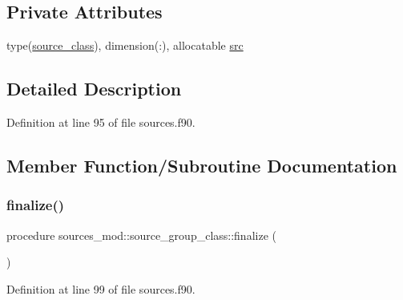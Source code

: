 \subsection*{Private Attributes}
\begin{DoxyCompactItemize}
\item 
type(\mbox{\hyperlink{structsources__mod_1_1source__class}{source\+\_\+class}}), dimension(\+:), allocatable \mbox{\hyperlink{structsources__mod_1_1source__group__class_af970ce2c935528f707bdbf4169995d7c}{src}}
\end{DoxyCompactItemize}


\subsection{Detailed Description}


Definition at line 95 of file sources.\+f90.



\subsection{Member Function/\+Subroutine Documentation}
\mbox{\label{structsources__mod_1_1source__group__class_ab1f12af6502f7e468e07d82555ea5cb9}} 
\subsubsection{\texorpdfstring{finalize()}{finalize()}}
{\footnotesize\ttfamily procedure sources\+\_\+mod\+::source\+\_\+group\+\_\+class\+::finalize (\begin{DoxyParamCaption}{ }\end{DoxyParamCaption})\hspace{0.3cm}{\ttfamily [private]}}



Definition at line 99 of file sources.\+f90.

\mbox{\label{structsources__mod_1_1source__group__class_a186abc677118adbf1f9cff405dac330e}} 
